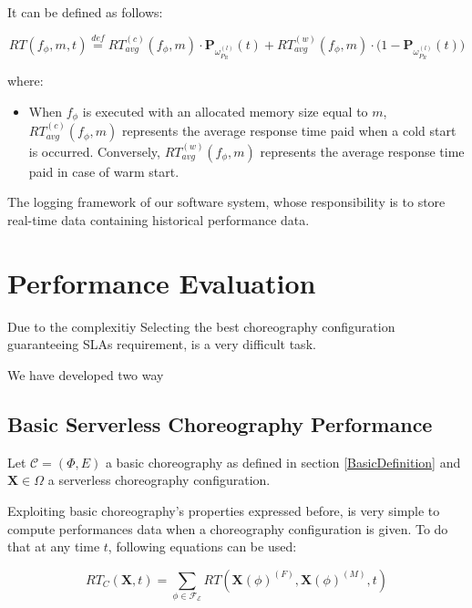 \documentclass[12pt,a4paper]{report}
\newcommand{\mathDef}{\overset{\textit{def}}{=}}
\begin{document}
\begin{itemize}
	It can be defined as follows:
	
	\begin{equation}
		RT(f_{\phi},m,t) \mathDef RT_{avg}^{(c)}(f_{\phi}, m) \cdot \textbf{P}_{\omega_{P_R}^{(l)}}(t) + RT_{avg}^{(w)}(f_{\phi}, m) \cdot \Big( 1 - \textbf{P}_{\omega_{P_R}^{(l)}}(t)  \Big)
	\end{equation}

	where:
	
	\begin{itemize}
		\item When $f_{\phi}$ is executed with an allocated memory size equal to $m$, 
		$RT_{avg}^{(c)}(f_{\phi}, m)$ represents the average response time paid when a cold start is occurred. Conversely, $RT_{avg}^{(w)}(f_{\phi}, m)$ represents the average response time paid in case of warm start.
	\end{itemize}


	
\end{itemize}




The logging framework of our software system, whose responsibility is to store
real-time data containing historical performance data.

\section{Performance Evaluation}

Due to the complexitiy Selecting the best choreography configuration guaranteeing SLAs requirement, is a very difficult task.

We have developed two way 


\subsection{Basic Serverless Choreography Performance}

Let $\mathcal{C} = (\Phi,E)$ a basic choreography as defined in section \ref{BasicDefinition} and $\textbf{X} \in \Omega$ a serverless choreography configuration.

Exploiting basic choreography's properties expressed before, is very simple to compute performances data when a choreography configuration is given. To do that at any time $t$, following equations can be used:

\begin{equation}\label{eq:perfF1}
	RT_C(\textbf{X}, t) = \sum_{\phi \in \mathscr{F_E}} RT(\textbf{X}(\phi)^{(F)},\textbf{X}(\phi)^{(M)},t)
\end{equation}
\end{document}
